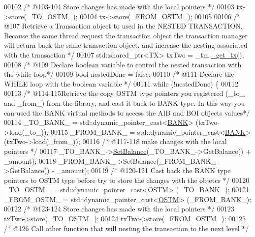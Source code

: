 \begin{DoxyCode}
00102             \textcolor{comment}{/* @103-104 Store changes has made with the local pointers */}
00103             tx->store(\_TO\_OSTM\_);
00104             tx->store(\_FROM\_OSTM\_);
00105             
00106             \textcolor{comment}{/* @107 Retrieve a Transaction object to used in the NESTED TRANSACTION. Because the same
       thread request the transaction object the transaction manager will return back the same transaction object, and
       increase the nesting associated with the transaction */}
00107             std::shared\_ptr<TX> txTwo = \_tm.\hyperlink{class_t_m_a41cb0226cc4080c931651b13f74a0075_a41cb0226cc4080c931651b13f74a0075}{\_get\_tx}();
00108              \textcolor{comment}{/* @109 Declare boolean variable to control the nested transaction with the while loop*/}
00109             \textcolor{keywordtype}{bool} nestedDone = \textcolor{keyword}{false};
00110             \textcolor{comment}{/* @111 Declare the WHILE loop with the boolean variable */}
00111             \textcolor{keywordflow}{while} (!nestedDone) \{
00112             
00113                 \textcolor{comment}{/* @114-115Retrieve the copy OSTM type pointers you registered (\_to\_ and \_from\_) from the
       library, and cast it back to BANK type. In this way you can used the BANK virtual methods to access the AIB
       and BOI objects values*/}
00114                 \_TO\_BANK\_ = std::dynamic\_pointer\_cast<\hyperlink{class_b_a_n_k}{BANK}> (txTwo->load(\_to\_));
00115                 \_FROM\_BANK\_ = std::dynamic\_pointer\_cast<\hyperlink{class_b_a_n_k}{BANK}> (txTwo->load(\_from\_));
00116                 \textcolor{comment}{/* @117-118 make changes with the local pointers */}
00117                 \_TO\_BANK\_->\hyperlink{class_b_a_n_k_ae3e45b407bf8ec7175662442ea24b7c0_ae3e45b407bf8ec7175662442ea24b7c0}{SetBalance}(\_TO\_BANK\_->GetBalance() + \_amount);
00118                 \_FROM\_BANK\_->SetBalance(\_FROM\_BANK\_->GetBalance() - \_amount);
00119                 \textcolor{comment}{/* @120-121 Cast back the BANK type pointers to OSTM type before try to store the changes
       with the objetcs */}
00120                 \_TO\_OSTM\_ = std::dynamic\_pointer\_cast<\hyperlink{class_o_s_t_m}{OSTM}> (\_TO\_BANK\_);
00121                 \_FROM\_OSTM\_ = std::dynamic\_pointer\_cast<\hyperlink{class_o_s_t_m}{OSTM}> (\_FROM\_BANK\_);
00122                 \textcolor{comment}{/* @123-124 Store changes has made with the local pointers */}
00123                 txTwo->store(\_TO\_OSTM\_);
00124                 txTwo->store(\_FROM\_OSTM\_);
00125                 \textcolor{comment}{/* @126 Call other function that will nesting the transaction to the next level */}

\end{DoxyCode}
